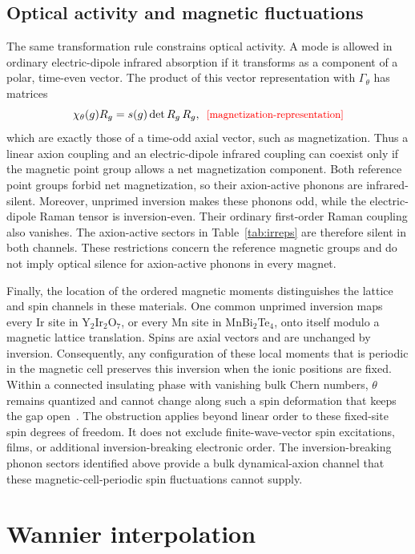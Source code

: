 \documentclass[galley,aps,pra,10pt,amsmath,amssymb,
    superscriptaddress,nofootinbib,longbibliography]{revtex4-2}
\def\Red#1{\textcolor{red}{#1}}
\newcounter{comm}
\newcommand{\eqlab}[1]{\Red{\hbox{\small\;\;[#1]}}\label{eq:#1}}
\newcommand{\eqlab}[1]{\label{eq:#1}}
\newcommand{\MBT}{MnBi$_2$Te$_4$}
\newcommand{\YIO}{Y$_2$Ir$_2$O$_7$}
\begin{document}
\subsection{Optical activity and magnetic fluctuations}

The same transformation rule constrains optical activity. A mode is allowed in ordinary electric-dipole infrared absorption if it transforms as a component of a polar, time-even vector. The product of this vector representation with $\Gamma_\theta$ has matrices
\begin{equation}
\chi_\theta(g)R_g=s(g)\det R_g\,R_g,
\eqlab{magnetization-representation}
\end{equation}
which are exactly those of a time-odd axial vector, such as magnetization. Thus a linear axion coupling and an electric-dipole infrared coupling can coexist only if the magnetic point group allows a net magnetization component. Both reference point groups forbid net magnetization, so their axion-active phonons are infrared-silent. Moreover, unprimed inversion makes these phonons odd, while the electric-dipole Raman tensor is inversion-even. Their ordinary first-order Raman coupling also vanishes. The axion-active sectors in Table~\ref{tab:irreps} are therefore silent in both channels. These restrictions concern the reference magnetic groups and do not imply optical silence for axion-active phonons in every magnet.

Finally, the location of the ordered magnetic moments distinguishes the lattice and spin channels in these materials. One common unprimed inversion maps every Ir site in \YIO{}, or every Mn site in \MBT{}, onto itself modulo a magnetic lattice translation. Spins are axial vectors and are unchanged by inversion. Consequently, any configuration of these local moments that is periodic in the magnetic cell preserves this inversion when the ionic positions are fixed. Within a connected insulating phase with vanishing bulk Chern numbers, $\theta$ remains quantized and cannot change along such a spin deformation that keeps the gap open~\cite{turner2012quantized,zhang2020large,sekine2021axion}. The obstruction applies beyond linear order to these fixed-site spin degrees of freedom. It does not exclude finite-wave-vector spin excitations, films, or additional inversion-breaking electronic order. The inversion-breaking phonon sectors identified above provide a bulk dynamical-axion channel that these magnetic-cell-periodic spin fluctuations cannot supply.


\section{Wannier interpolation}
\end{document}
